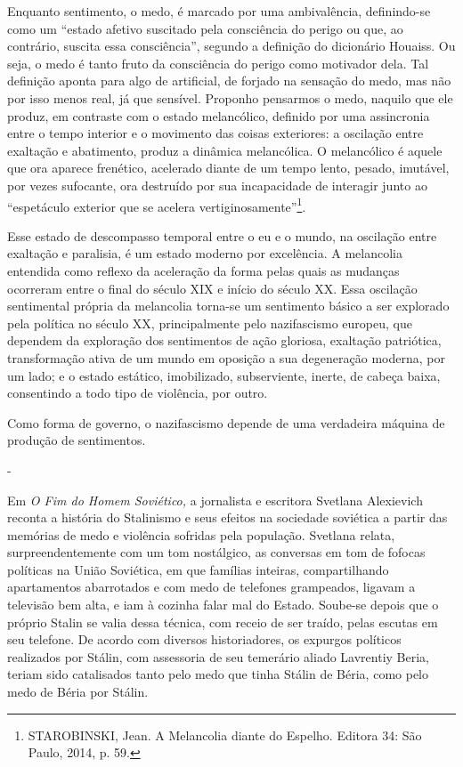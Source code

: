 Enquanto sentimento, o medo, é marcado por uma ambivalência,
definindo-se como um ``estado afetivo suscitado pela consciência do
perigo ou que, ao contrário, suscita essa consciência'', segundo a
definição do dicionário Houaiss. Ou seja, o medo é tanto fruto da
consciência do perigo como motivador dela. Tal definição aponta para
algo de artificial, de forjado na sensação do medo, mas não por isso
menos real, já que sensível. Proponho pensarmos o medo, naquilo que ele
produz, em contraste com o estado melancólico, definido por uma
assincronia entre o tempo interior e o movimento das coisas exteriores:
a oscilação entre exaltação e abatimento, produz a dinâmica melancólica.
O melancólico é aquele que ora aparece frenético, acelerado diante de um
tempo lento, pesado, imutável, por vezes sufocante, ora destruído por
sua incapacidade de interagir junto ao ``espetáculo exterior que se
acelera vertiginosamente''\footnote{STAROBINSKI, Jean. A Melancolia
  diante do Espelho. Editora 34: São Paulo, 2014, p. 59.}.

Esse estado de descompasso temporal entre o eu e o mundo, na oscilação
entre exaltação e paralisia, é um estado moderno por excelência. A
melancolia entendida como reflexo da aceleração da forma pelas quais as
mudanças ocorreram entre o final do século XIX e início do século XX.
Essa oscilação sentimental própria da melancolia torna-se um sentimento
básico a ser explorado pela política no século XX, principalmente pelo
nazifascismo europeu, que dependem da exploração dos sentimentos de ação
gloriosa, exaltação patriótica, transformação ativa de um mundo em
oposição a sua degeneração moderna, por um lado; e o estado estático,
imobilizado, subserviente, inerte, de cabeça baixa, consentindo a todo
tipo de violência, por outro.

Como forma de governo, o nazifascismo depende de uma verdadeira máquina
de produção de sentimentos.

-

Em \emph{O Fim do Homem Soviético,} a jornalista e escritora Svetlana
Alexievich reconta a história do Stalinismo e seus efeitos na sociedade
soviética a partir das memórias de medo e violência sofridas pela
população. Svetlana relata, surpreendentemente com um tom nostálgico, as
conversas em tom de fofocas políticas na União Soviética, em que
famílias inteiras, compartilhando apartamentos abarrotados e com medo de
telefones grampeados, ligavam a televisão bem alta, e iam à cozinha
falar mal do Estado. Soube-se depois que o próprio Stalin se valia dessa
técnica, com receio de ser traído, pelas escutas em seu telefone. De
acordo com diversos historiadores, os expurgos políticos realizados por
Stálin, com assessoria de seu temerário aliado Lavrentiy Beria, teriam
sido catalisados tanto pelo medo que tinha Stálin de Béria, como pelo
medo de Béria por Stálin.


